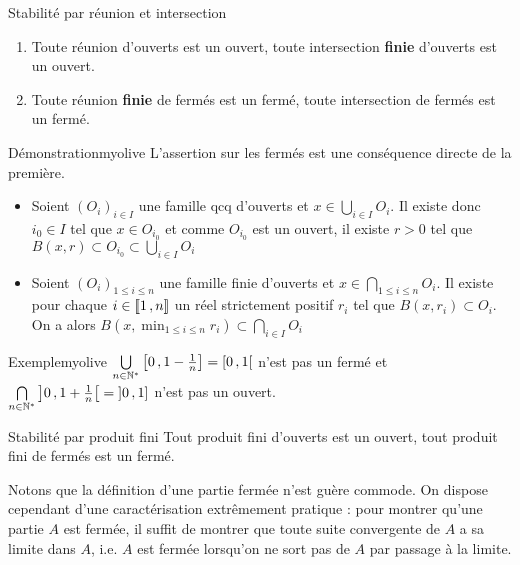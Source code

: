     \begin{prop}{Stabilité par réunion et intersection}{}
        \begin{enumerate}
            \item Toute réunion d’ouverts est un ouvert, toute intersection \textbf{finie} d’ouverts est un ouvert.
            \item Toute réunion \textbf{finie} de fermés est un fermé, toute intersection de fermés est un fermé.
        \end{enumerate}
    \end{prop}

    \begin{demo}{Démonstration}{myolive}
        L’assertion sur les fermés est une conséquence directe de la première.
        \begin{itemize}
            \item Soient $(O_i)_{i \in I}$ une famille qcq d’ouverts et $x \in \bigcup\limits_{i \in I} O_i$. Il existe donc $i_0 \in I$ tel que $x \in O_{i_0}$ et comme $O_{i_0}$ est un ouvert, il existe $r > 0$ tel que $B(x,r) \subset O_{i_0} \subset \bigcup\limits_{i \in I} O_i$
            \item Soient $(O_i)_{1 \leq i \leq n}$ une famille finie d’ouverts et $x \in \bigcap\limits_{1 \leq i \leq n} O_i$. Il existe pour chaque $i \in \left\llbracket 1 \, , n \right\rrbracket$ un réel strictement positif $r_i$ tel que $B(x,r_i) \subset O_i$. On a alors $B(x,\min_{1 \leq i \leq n} r_i) \subset \bigcap\limits_{i \in I} O_i$
        \end{itemize}
    \end{demo}

    \begin{omed}{Exemple}{myolive}
        $\bigcup\limits_{n \in \mathbb{N}^*} \left[ 0 \, , 1-\frac{1}{n} \right] = \left[ 0 \, , 1 \right[$ n’est pas un fermé et $\bigcap\limits_{n \in \mathbb{N}^*} \left] 0 \, , 1 + \frac{1}{n} \right[ = \left] 0 \, , 1 \right]$ n’est pas un ouvert.
    \end{omed}

    \begin{prop}{Stabilité par produit fini}
        Tout produit fini d’ouverts est un ouvert, tout produit fini de fermés est un fermé.
    \end{prop}

    Notons que la définition d’une partie fermée n’est guère commode. On dispose cependant d’une caractérisation extrêmement pratique : pour montrer qu’une partie $A$ est fermée, il suffit de montrer que toute suite convergente de $A$ a sa limite dans $A$, i.e. $A$ est fermée lorsqu’on ne sort pas de $A$ par passage à la limite.

